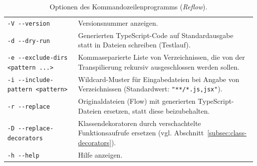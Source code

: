 \begin{table}[tbh]
  \small
  \begin{tabu} to  %
    \midrule
     &  \\
    \midrule
    \medskip
    \texttt{-V -{}-version} & Versionsnummer anzeigen. \\
    \medskip
    \texttt{-d -{}-dry-run} & Generierten TypeScript-Code auf Standardausgabe statt in Dateien schreiben (Testlauf).\\
    \medskip
    \texttt{-e -{}-exclude-dirs <pattern ...>} & Kommaseparierte Liste von Verzeichnissen, die von der Transpilierung rekursiv ausgeschlossen werden sollen. \\
    \medskip
    \texttt{-i -{}-include-pattern <pattern>} & Wildcard-Muster für Eingabedateien bei Angabe von Verzeichnissen (Standardwert: \texttt{"**/*.{js,jsx}"}). \\
    \medskip
    \texttt{-r -{}-replace} & Originaldateien (Flow) mit generierten TypeScript-Dateien ersetzen, statt diese beizubehalten. \\
    \medskip
    \texttt{-D -{}-replace-decorators} & Klassendekoratoren durch verschachtelte Funktionsaufrufe ersetzen (vgl. Abschnitt~\ref{subsec:class-decorators}). \\
    \medskip
    \texttt{-h -{}-help} & Hilfe anzeigen. \\
    \midrule
  \end{tabu}
  \caption{Optionen des Kommandozeilenprogramms (\textit{Reflow}).}
  \label{tab:cli-options}
\end{table}

